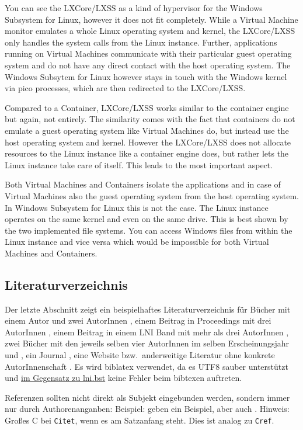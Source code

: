 \documentclass[utf8,biblatex]{lni}
\begin{document}
You can see the LXCore/LXSS as a kind of hypervisor for the Windows Subsystem for Linux, however it does not fit completely. While a Virtual Machine monitor 
emulates a whole Linux operating system and kernel, the LXCore/LXSS only handles the system calls from the Linux instance. Further, applications running on Virtual Machines communicate with their particular guest operating system and do not have any direct contact with the host operating system. The Windows Subsytem for Linux however stays in touch with the Windows kernel via pico processes, which are then redirected to the LXCore/LXSS. 

Compared to a Container, LXCore/LXSS works similar to the container engine but again, not entirely. The similarity comes with the fact that containers do not emulate a guest operating system like Virtual Machines do, but instead use the host operating system and kernel. However the LXCore/LXSS does not allocate resources to the Linux instance like a container engine does, but rather lets the Linux instance take care of itself. This leads to the most important aspect.

Both Virtual Machines and Containers isolate the applications and in case of Virtual Machines also the guest operating system from the host operating system. In Windows Subsystem for Linux this is not the case. The Linux instance operates on the same kernel and even on the same drive. This is best shown by the two implemented file systems. You can access Windows files from within the Linux instance and vice versa which would be impossible for both Virtual Machines and Containers.

\subsection{Literaturverzeichnis}
Der letzte Abschnitt zeigt ein beispielhaftes Literaturverzeichnis für Bücher mit einem Autor \cite{Ez10} und zwei AutorInnen \cite{AB00}, einem Beitrag in Proceedings mit drei AutorInnen \cite{ABC01}, einem Beitrag in einem LNI Band mit mehr als drei AutorInnen \cite{Az09}, zwei Bücher mit den jeweils selben vier AutorInnen im selben Erscheinungsjahr \cite{Wa14} und \cite{Wa14b}, ein Journal \cite{Gl06}, eine Website \cite{GI14} bzw.\ anderweitige Literatur ohne konkrete AutorInnenschaft \cite{XX14}.
Es wird biblatex verwendet, da es UTF8 sauber unterstützt und \href{https://github.com/gi-ev/LNI/issues/5}{im Gegensatz zu lni.bst} keine Fehler beim bibtexen auftreten.

Referenzen sollten nicht direkt als Subjekt eingebunden werden, sondern immer nur durch Authorenanganben:
Beispiel:  geben ein Beispiel, aber auch \citet{Az09}.
Hinweis: Großes C bei \texttt{Citet}, wenn es am Satzanfang steht. Dies ist analog zu \texttt{Cref}.
\end{document}
